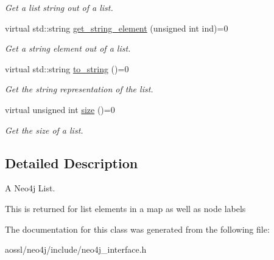 \begin{DoxyCompactItemize}
\begin{DoxyCompactList}\small\item\em Get a list string out of a list. \end{DoxyCompactList}\item 
virtual std\+::string \hyperlink{classDbListInterface_a5b56c68ef216efd371e17d65ad6adee1}{get\+\_\+string\+\_\+element} (unsigned int ind)=0\hypertarget{classDbListInterface_a5b56c68ef216efd371e17d65ad6adee1}{}\label{classDbListInterface_a5b56c68ef216efd371e17d65ad6adee1}

\begin{DoxyCompactList}\small\item\em Get a string element out of a list. \end{DoxyCompactList}\item 
virtual std\+::string \hyperlink{classDbListInterface_a18c8fd940cf2225ef9417e2b54ed0fe2}{to\+\_\+string} ()=0\hypertarget{classDbListInterface_a18c8fd940cf2225ef9417e2b54ed0fe2}{}\label{classDbListInterface_a18c8fd940cf2225ef9417e2b54ed0fe2}

\begin{DoxyCompactList}\small\item\em Get the string representation of the list. \end{DoxyCompactList}\item 
virtual unsigned int \hyperlink{classDbListInterface_a5e811b296b3bf7cea5149fce6d69138d}{size} ()=0\hypertarget{classDbListInterface_a5e811b296b3bf7cea5149fce6d69138d}{}\label{classDbListInterface_a5e811b296b3bf7cea5149fce6d69138d}

\begin{DoxyCompactList}\small\item\em Get the size of a list. \end{DoxyCompactList}\end{DoxyCompactItemize}


\subsection{Detailed Description}
A Neo4j List. 

This is returned for list elements in a map as well as node labels 

The documentation for this class was generated from the following file\+:\begin{DoxyCompactItemize}
\item 
aossl/neo4j/include/neo4j\+\_\+interface.\+h\end{DoxyCompactItemize}
